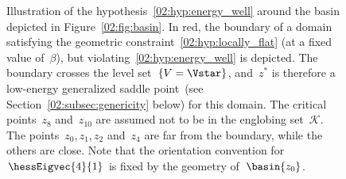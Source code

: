     \begin{figure}
        \center
        \caption[Energetic condition in~\cite{BLS25a}]{Illustration of the hypothesis~\eqref{02:hyp:energy_well} around the basin depicted in Figure~\ref{02:fig:basin}. In red, the boundary of a domain satisfying the geometric constraint~\eqref{02:hyp:locally_flat} (at a fixed value of~$\beta$), but violating~\eqref{02:hyp:energy_well} is depicted. The boundary crosses the level set~$\{V=\Vstar\}$, and~$z^*$ is therefore a low-energy generalized saddle point~(see Section~\ref{02:subsec:genericity} below) for this domain. The critical points~$z_8$ and~$z_{10}$ are assumed not to be in the englobing set~$\mathcal K$. The points~$z_0,z_1,z_2$ and~$z_4$ are far from the boundary, while the others are close. Note that the orientation convention for~$\hessEigvec{4}{1}$ is fixed by the geometry of~$\basin{z_0}$.}
        \label{02:fig:energy_neighborhood}
    \end{figure}

